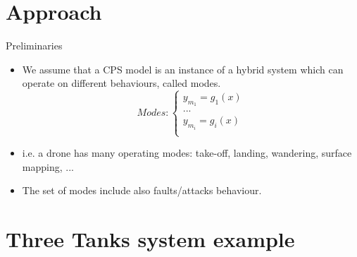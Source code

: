 \documentclass{beamer}
\def\itemizespace{\vspace{3mm}}
\begin{document}
\section{Approach}


\begin{frame}{Preliminaries}
    \begin{itemize}
		\item \alert<+>{We assume that a CPS model is an instance of a hybrid
			system which can operate on different behaviours, called modes.
			\[
				Modes:	\begin{cases}
							y_{m_1} = g_1(x)	\\
							...					\\
							y_{m_i} = g_i(x)	\\
						\end{cases}
			\]
			}

		\itemizespace

		\item \alert<+>{i.e. a drone has many operating modes: take-off,
			landing, wandering, surface mapping, ...}

		\itemizespace

		\item \alert<+>{The set of modes include also faults/attacks behaviour.}
    \end{itemize}
\end{frame}


\section{Three Tanks system example}
\end{document}
